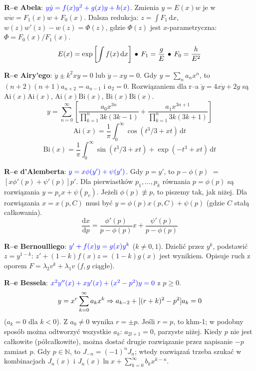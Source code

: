 \begin{multicols}{2}
\begin{enumx}
\item \textbf{R--e Abela}: $\color{blue}y\dot y = f(x) y^2 + g(x)y + h(x)$.
Zmienia $y = E(x) w$ je w $w \dot w = F_1(x) w + F_0(x)$.
Dalsza redukcja: $z = \int F_1\,\textrm{d}x$, $w(z)w'(z) - w(z)= \Phi(z)$, gdzie $\Phi(z)$ jest $x$-parametryczna: $\Phi = F_0(x) / F_1(x)$.
$$
	E(x) = \exp\left[\int f(x)\,\textrm{d}x\right] \, \bullet \,
	F_1 = \frac g E \, \bullet \,
	F_0 = \frac h{E^2}
$$
\item \textbf{R--e Airy'ego}: $\ddot y \pm k^2 xy = 0$ lub $\ddot y - xy = 0$.
Gdy $y = \sum_n a_n x^n$, to $(n+2)(n+1) a_{n+2} = a_{n-1}$ i $a_2 = 0$.
Rozwiązaniem dla r--a $\dddot{y} = 4x\dot y + 2y$ są $\textrm{Ai}(x)\textrm{Ai}(x)$, $\textrm{Ai}(x) \textrm{Bi} (x)$, $\textrm{Bi}(x)\textrm{Bi}(x)$.
\[
	y = \sum_{n=0}^\infty \left[ \frac{ a_0 x^{3n}}{\prod_{k=1}^n {3k(3k-1)}} + \frac{a_1 x^{3n+1} }{\prod_{k=1}^n {3k(3k+1)}}  \right]
\]
\[
	\textrm{Ai}(x) = \frac 1 \pi \int_0^\infty {\cos(t^3/3+xt)} \,\textrm{d}t
\]
\[
	\textrm{Bi}(x) = \frac 1 \pi \int_0^\infty {\sin(t^3/3+xt) + \exp(-t^3+xt)} \,\textrm{d}t
\]
\item \textbf{R--e d'Alemberta}: $\color{blue}y = x \phi(y') + \psi(y')$.
Gdy $p = y'$, to $p - \phi(p)$ $=$  $ [x \phi'(p) + \psi'(p)] p'$. 
Dla pierwiastków $p_1, \dots, p_k$ równania $p = \phi(p)$ są rozwiązania $y = p_v x + \psi(p_v)$.
Jeżeli $\phi(p) \not \equiv p$, to piszemy tak, jak niżej.
Dla rozwiązania $x = x(p, C)$ musi być $y = \phi(p) x(p,C) + \psi(p)$ (gdzie $C$ stałą całkowania). %
 \[
	\frac{\textrm{d}x}{\textrm{d}p} = \frac{\phi'(p)}{p - \phi(p)} x + \frac{\psi'(p)}{p-\phi(p)}
	\]
\item \textbf{R--e Bernoulliego}: $\color{blue}y' + f(x) y = g(x) y^k$ ($k \neq 0, 1$). 
Dzielić przez $y^k$, podstawić $z = y^{1-k}$: $z' + (1-k)f(x) z = (1-k)g(x)$ jest wynikiem.
Opisuje ruch z oporem $F = \lambda_2 v^k + \lambda_1 v$ ($f, g$ ciągłe).
\item \textbf{R--e Bessela}: $\color{blue}x^2 y''(x) + x y'(x) + (x^2-p^2)y = 0$ z $p \ge 0$.
\[
y = x^r \sum_{k=0}^\infty a_k x^k \Rightarrow a_{k-2} + [(r+k)^2-p^2] a_k = 0
\]
($a_k = 0$ dla $k < 0$).
Z $a_0 \neq 0$ wynika $r = \pm p$.
Jeśli $r = p$, to khm-1; w podobny sposób można odtworzyć wszystkie $a_k$: $a_{2l+1} = 0$, parzyste niżej.
Kiedy $p$ nie jest całkowite (półcałkowite), można dostać drugie rozwiązanie przez napisanie $-p$ zamiast $p$.
Gdy $p \in \mathbb N$, to $J_{-n} = (-1)^n J_n$; wtedy rozwiązań trzeba szukać w kombinacjach $J_n(x)$ i $J_n(x) \ln x + \sum_{k=0}^\infty b_k x^{k-n}$.

\end{enumx}
\end{multicols}
